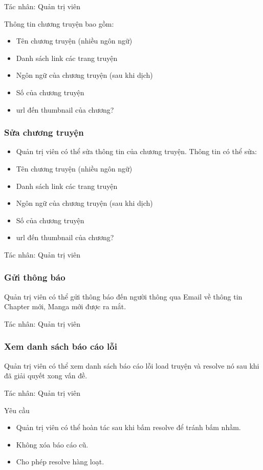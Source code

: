 \documentclass[./../main.tex]{subfiles}
\begin{document}
Tác nhân: Quản trị viên


Thông tin chương truyện bao gồm:
\begin{itemize}
\item Tên chương truyện (nhiều ngôn ngữ)
\item Danh sách link các trang truyện
\item Ngôn ngữ của chương truyện (sau khi dịch)
\item Số của chương truyện
\item url đến thumbnail của chương?
\end{itemize}
\subsubsection{Sửa chương truyện}
\begin{itemize}
\item Quản trị viên có thể sửa thông tin của chương truyện. Thông tin có thể sửa:
\item Tên chương truyện (nhiều ngôn ngữ)
\item Danh sách link các trang truyện
\item Ngôn ngữ của chương truyện (sau khi dịch)
\item Số của chương truyện
\item url đến thumbnail của chương?
\end{itemize}

Tác nhân: Quản trị viên
\subsubsection{Gửi thông báo}
Quản trị viên có thể gửi thông báo đến người thông qua Email về thông tin Chapter mới, Manga mới được ra mắt.


Tác nhân: Quản trị viên
\subsubsection{Xem danh sách báo cáo lỗi}
Quản trị viên có thể xem danh sách báo cáo lỗi load truyện và resolve nó sau khi đã giải quyết xong vấn đề.


Tác nhân: Quản trị viên


Yêu cầu
\begin{itemize}
\item Quản trị viên có thể hoàn tác sau khi bấm resolve để tránh bấm nhầm.
\item Không xóa báo cáo cũ.
\item Cho phép resolve hàng loạt.
\end{itemize}
\end{document}
